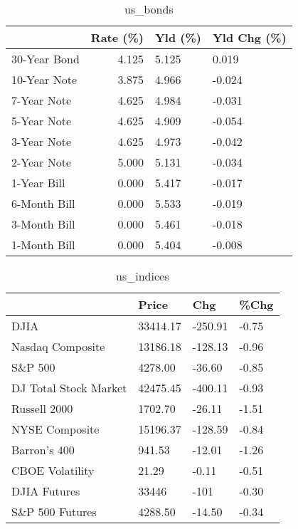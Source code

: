 \documentclass{article}%
\begin{document}
\begin{table}[htbp]%
\caption{us\_bonds}%
\centering%
\begin{adjustbox}{width=1\textwidth}%
\begin{tabular}{lrll}
\toprule
             &  Rate (\%) & Yld (\%) & Yld Chg (\%) \\
\midrule
30-Year Bond &     4.125 &   5.125 &       0.019 \\
10-Year Note &     3.875 &   4.966 &      -0.024 \\
 7-Year Note &     4.625 &   4.984 &      -0.031 \\
 5-Year Note &     4.625 &   4.909 &      -0.054 \\
 3-Year Note &     4.625 &   4.973 &      -0.042 \\
 2-Year Note &     5.000 &   5.131 &      -0.034 \\
 1-Year Bill &     0.000 &   5.417 &      -0.017 \\
6-Month Bill &     0.000 &   5.533 &      -0.019 \\
3-Month Bill &     0.000 &   5.461 &      -0.018 \\
1-Month Bill &     0.000 &   5.404 &      -0.008 \\
\bottomrule
\end{tabular}
%
\end{adjustbox}%
\end{table}

%


\begin{table}[htbp]%
\caption{us\_indices}%
\centering%
\begin{adjustbox}{width=1\textwidth}%
\begin{tabular}{llll}
\toprule
                      &    Price &     Chg &  \%Chg \\
\midrule
                 DJIA & 33414.17 & -250.91 & -0.75 \\
     Nasdaq Composite & 13186.18 & -128.13 & -0.96 \\
              S\&P 500 &  4278.00 &  -36.60 & -0.85 \\
DJ Total Stock Market & 42475.45 & -400.11 & -0.93 \\
         Russell 2000 &  1702.70 &  -26.11 & -1.51 \\
       NYSE Composite & 15196.37 & -128.59 & -0.84 \\
         Barron's 400 &   941.53 &  -12.01 & -1.26 \\
      CBOE Volatility &    21.29 &   -0.11 & -0.51 \\
         DJIA Futures &    33446 &    -101 & -0.30 \\
      S\&P 500 Futures &  4288.50 &  -14.50 & -0.34 \\
\bottomrule
\end{tabular}
%
\end{adjustbox}%
\end{table}
\end{document}
